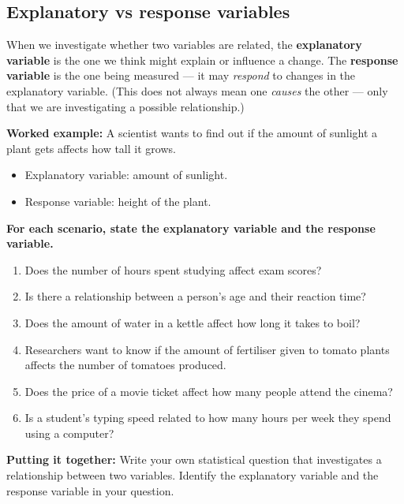 \documentclass[11pt]{article}
\newcommand{\ans}{\hrulefill}
\newcommand{\anshere}{\par\vspace{0.4em}\noindent\ans\par\vspace{0.4em}}
\begin{document}
\newpage

\subsection*{Explanatory vs response variables}
\noindent When we investigate whether two variables are related, the \textbf{explanatory
variable} is the one we think might explain or influence a change. The \textbf{response
variable} is the one being measured --- it may \emph{respond} to changes in the explanatory
variable. (This does not always mean one \emph{causes} the other --- only that we are
investigating a possible relationship.)

\vspace{0.3em}
\noindent\textbf{Worked example:} A scientist wants to find out if the amount of sunlight a
plant gets affects how tall it grows.
\begin{itemize}[leftmargin=1.4em, itemsep=0.2em, topsep=0.2em]
  \item Explanatory variable: amount of sunlight.
  \item Response variable: height of the plant.
\end{itemize}

\vspace{0.4em}
\noindent\textbf{For each scenario, state the explanatory variable and the response variable.}
\begin{enumerate}[label=(\alph*)]
  \item Does the number of hours spent studying affect exam scores?
  \anshere
  \item Is there a relationship between a person's age and their reaction time?
  \anshere
  \item Does the amount of water in a kettle affect how long it takes to boil?
  \anshere
  \item Researchers want to know if the amount of fertiliser given to tomato plants affects the
    number of tomatoes produced.
  \anshere
  \item Does the price of a movie ticket affect how many people attend the cinema?
  \anshere
  \item Is a student's typing speed related to how many hours per week they spend using a
    computer?
  \anshere
\end{enumerate}

\vspace{0.4em}
\noindent\textbf{Putting it together:} Write your own statistical question that investigates a
relationship between two variables. Identify the explanatory variable and the response variable
in your question.
\anshere
\anshere
\end{document}
